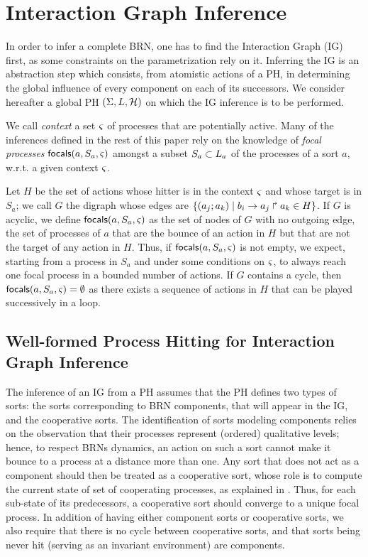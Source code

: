\section{Interaction Graph Inference}\label{sec:infer-IG}

In order to infer a complete BRN, one has to find the Interaction Graph (IG) first, as some constraints on the parametrization rely on it.
Inferring the IG is an abstraction step which consists, from atomistic actions of a PH, in determining the global influence of every component on each of its successors.
We consider hereafter a global PH $(\Sigma,L,\mathcal{H})$ on which the IG inference is to be performed.

We call \emph{context} a set $\varsigma$ of processes that are potentially active.
Many of the inferences defined in the rest of this paper rely on the knowledge of \emph{focal processes} $\mathsf{focals}(a,S_a,\varsigma)$
amongst a subset $S_a \subset L_a$ of the processes of a sort $a$, w.r.t. a given context $\varsigma$.

Let $H$ be the set of actions whose hitter is in the context $\varsigma$ and whose target is in $S_a$;
we call $G$ the digraph whose edges are $\{(a_j; a_k) \mid b_i\rightarrow a_j\Rsh a_k \in H\}$.
If $G$ is acyclic, we define $\mathsf{focals}(a,S_a,\varsigma)$ as the set of nodes of $G$ with no outgoing edge, \ie the set of processes of $a$ that are the bounce of an action in $H$ but that are not the target of any action in $H$.
Thus, if $\mathsf{focals}(a,S_a,\varsigma)$ is not empty, we expect, starting from a process in $S_a$ and under some conditions on $\varsigma$, to always reach one focal process in a bounded number of actions.
If $G$ contains a cycle, then $\mathsf{focals}(a,S_a,\varsigma) = \emptyset$ as there exists a sequence of actions in $H$ that can be played successively in a loop.



\subsection{Well-formed Process Hitting for Interaction Graph Inference}\label{ssec:wf}

The inference of an IG from a PH assumes that the PH defines two types of sorts: the sorts corresponding to BRN components, that will appear in the IG, and the cooperative sorts.
The identification of sorts modeling components relies on the observation that their processes represent (ordered) qualitative levels;
hence, to respect BRNs dynamics, an action on such a sort cannot make it bounce to a process at a distance more than one.
Any sort that does not act as a component should then be treated as a cooperative sort, whose role is to compute the current state of set of cooperating processes, as explained in .
Thus, for each sub-state of its predecessors, a cooperative sort should converge to a unique focal process.
In addition of having either component sorts or cooperative sorts, we also require that there is no cycle between cooperative sorts, and that sorts being never hit (\ie serving as an invariant environment) are components.


